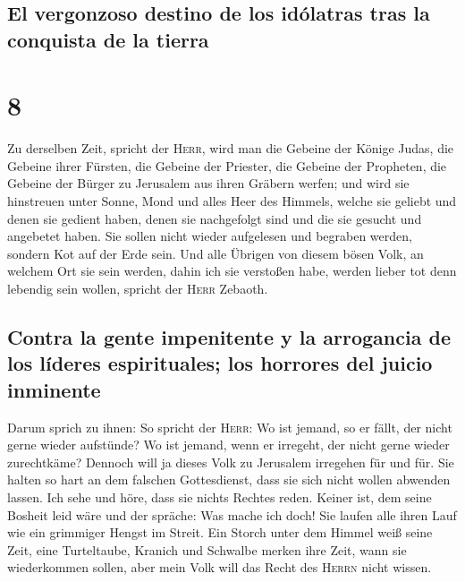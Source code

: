 \hypertarget{el-vergonzoso-destino-de-los-iduxf3latras-tras-la-conquista-de-la-tierra}{%
\subsection{El vergonzoso destino de los idólatras tras la conquista de
la
tierra}\label{el-vergonzoso-destino-de-los-iduxf3latras-tras-la-conquista-de-la-tierra}}

\hypertarget{section-7}{%
\section{8}\label{section-7}}

 Zu derselben Zeit, spricht der \textsc{Herr}, wird man
die Gebeine der Könige Judas, die Gebeine ihrer Fürsten, die Gebeine der
Priester, die Gebeine der Propheten, die Gebeine der Bürger zu Jerusalem
aus ihren Gräbern werfen;  und wird sie hinstreuen unter
Sonne, Mond und alles Heer des Himmels, welche sie geliebt und denen sie
gedient haben, denen sie nachgefolgt sind und die sie gesucht und
angebetet haben. Sie sollen nicht wieder aufgelesen und begraben werden,
sondern Kot auf der Erde sein.  Und alle Übrigen von
diesem bösen Volk, an welchem Ort sie sein werden, dahin ich sie
verstoßen habe, werden lieber tot denn lebendig sein wollen, spricht der
\textsc{Herr} Zebaoth.

\hypertarget{contra-la-gente-impenitente-y-la-arrogancia-de-los-luxedderes-espirituales-los-horrores-del-juicio-inminente}{%
\subsection{Contra la gente impenitente y la arrogancia de los líderes
espirituales; los horrores del juicio
inminente}\label{contra-la-gente-impenitente-y-la-arrogancia-de-los-luxedderes-espirituales-los-horrores-del-juicio-inminente}}

 Darum sprich zu ihnen: So spricht der \textsc{Herr}: Wo
ist jemand, so er fällt, der nicht gerne wieder aufstünde? Wo ist
jemand, wenn er irregeht, der nicht gerne wieder zurechtkäme?
 Dennoch will ja dieses Volk zu Jerusalem irregehen für
und für. Sie halten so hart an dem falschen Gottesdienst, dass sie sich
nicht wollen abwenden lassen.  Ich sehe und höre, dass sie
nichts Rechtes reden. Keiner ist, dem seine Bosheit leid wäre und der
spräche: Was mache ich doch! Sie laufen alle ihren Lauf wie ein
grimmiger Hengst im Streit.  Ein Storch unter dem Himmel
weiß seine Zeit, eine Turteltaube, Kranich und Schwalbe merken ihre
Zeit, wann sie wiederkommen sollen, aber mein Volk will das Recht des
\textsc{Herrn} nicht wissen.

